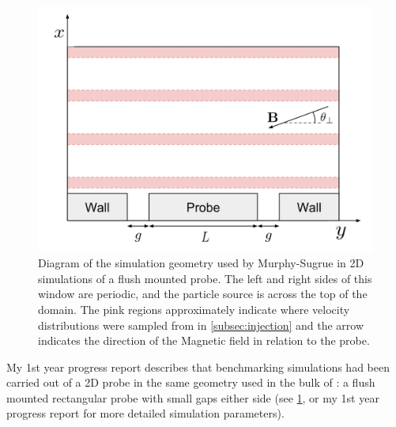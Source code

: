\documentclass[a4paper, 11pt]{article} %
\begin{document}
	\begin{figure}
		
		\vspace{-10pt}
		\centering
		\includegraphics[width=1.0\linewidth]{PRYear2/probegeometry.png}
		
		\caption{
			\label{fig:simulationmodel}Diagram of the simulation geometry used by 	Murphy-Sugrue in 2D simulations of a flush mounted probe. 
			The left and right sides of this window are periodic, and the particle source is across the top of the domain. 
			The pink regions approximately indicate where velocity distributions were sampled from in \cref{subsec:injection} and the arrow indicates the direction of the Magnetic field in relation to the probe.
		}
		\vspace{-20pt}
	\end{figure}
	My 1st year progress report describes that benchmarking simulations had been carried out of a 2D probe in the same geometry used in the bulk of \cite{Murphy-Sugrue2017a}: a flush mounted rectangular probe with small gaps either side (see \cref{fig:simulationmodel}, or my 1st year progress report for more detailed simulation parameters).
\end{document}

